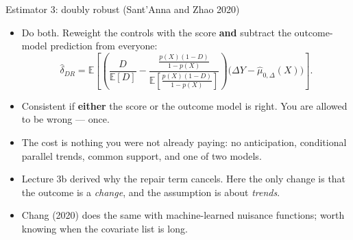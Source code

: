 \documentclass[
  11pt,
  ignorenonframetext,
  aspectratio=169,
]{beamer}
\providecommand{\tightlist}{%
  \setlength{\itemsep}{0pt}\setlength{\parskip}{0pt}}
\begin{document}
\begin{frame}{Estimator 3: doubly robust (Sant'Anna and Zhao 2020)}
\protect{}\label{estimator-3-doubly-robust-santanna-and-zhao-2020}
\begin{itemize}
\tightlist
\item
  Do both. Reweight the controls with the score \textbf{and} subtract
  the outcome-model prediction from everyone: \[
  \hat\delta_{DR} = \mathbb{E}\!\left[\left(\frac{D}{\mathbb{E}[D]} - \frac{\frac{p(X)(1-D)}{1-p(X)}}{\mathbb{E}\!\left[\frac{p(X)(1-D)}{1-p(X)}\right]}\right)\big(\Delta Y - \hat\mu_{0,\Delta}(X)\big)\right].
  \]
\item
  Consistent if \textbf{either} the score or the outcome model is right.
  You are allowed to be wrong --- once.
\item
  The cost is nothing you were not already paying: no anticipation,
  conditional parallel trends, common support, and one of two models.
\end{itemize}

\vspace{0.3em}

\begin{itemize}
\tightlist
\item
  Lecture 3b derived why the repair term cancels. Here the only change
  is that the outcome is a \emph{change}, and the assumption is about
  \emph{trends}.
\item
  Chang (2020) does the same with machine-learned nuisance functions;
  worth knowing when the covariate list is long.
\end{itemize}
\end{frame}
\end{document}
